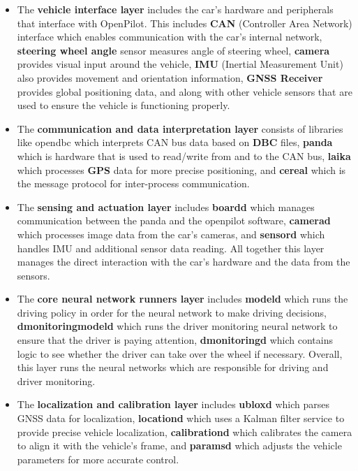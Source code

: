 \documentclass[12pt]{article}
\begin{document}
\begin{itemize}
    \begin{itemize}
        \item The \textbf{vehicle interface layer} includes the car’s hardware and peripherals that interface with OpenPilot. This includes \textbf{CAN} (Controller Area Network) interface which enables communication with the car’s internal network, \textbf{steering wheel angle} sensor measures angle of steering wheel, \textbf{camera} provides visual input around the vehicle, \textbf{IMU} (Inertial Measurement Unit) also provides movement and orientation information, \textbf{GNSS Receiver} provides global positioning data, and along with other vehicle sensors that are used to ensure the vehicle is functioning properly.
    
        \item The \textbf{communication and data interpretation layer} consists of libraries like opendbc which interprets CAN bus data based on \textbf{DBC} files, \textbf{panda} which is hardware that is used to read/write from and to the CAN bus, \textbf{laika} which processes \textbf{GPS} data for more precise positioning, and \textbf{cereal} which is the message protocol for inter-process communication.
        
        \item The \textbf{sensing and actuation layer} includes \textbf{boardd} which manages communication between the panda and the openpilot software, \textbf{camerad} which processes image data from the car’s cameras, and \textbf{sensord} which handles IMU and additional sensor data reading. All together this layer manages the direct interaction with the car’s hardware and the data from the sensors.
        
        \item The \textbf{core neural network runners layer} includes \textbf{modeld} which runs the driving policy in order for the neural network to make driving decisions, \textbf{dmonitoringmodeld} which runs the driver monitoring neural network to ensure that the driver is paying attention, \textbf{dmonitoringd} which contains logic to see whether the driver can take over the wheel if necessary. Overall, this layer runs the neural networks which are responsible for driving and driver monitoring.
        
        \item The \textbf{localization and calibration layer} includes \textbf{ubloxd} which parses GNSS data for localization, \textbf{locationd} which uses a Kalman filter service to provide precise vehicle localization, \textbf{calibrationd} which calibrates the camera to align it with the vehicle’s frame, and \textbf{paramsd} which adjusts the vehicle parameters for more accurate control.
        

\end{itemize}
\end{itemize}
\end{document}
